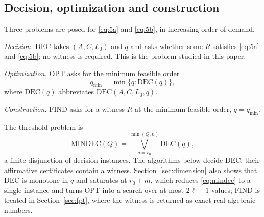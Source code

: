 \documentclass[journal]{IEEEtran}
\theoremstyle{plainn}
\theoremstyle{remark}
\begin{document}
\subsection{Decision, optimization and construction}\label{sec:problems}

Three problems are posed for \eqref{eq:5a} and \eqref{eq:5b}, in increasing order of
demand.

\emph{Decision.} $\mathrm{DEC}$ takes $(A,C,L_0)$ and $q$ and asks whether some $R$
satisfies \eqref{eq:5a} and \eqref{eq:5b}; no witness is required. This is the problem
studied in this paper.

\emph{Optimization.} $\mathrm{OPT}$ asks for the minimum feasible order
\begin{equation*}
q_{\min}=\min\{q:\mathrm{DEC}(q)\},
\end{equation*}
where $\mathrm{DEC}(q)$ abbreviates $\mathrm{DEC}(A,C,L_0,q)$.

\emph{Construction.} $\mathrm{FIND}$ asks for a witness $R$ at the minimum feasible
order, $q=q_{\min}$.

The threshold problem is
\begin{equation}\label{eq:mindec}
\mathrm{MINDEC}(Q)=\bigvee_{q=r_0}^{\min(Q,n)}\mathrm{DEC}(q),
\end{equation}
a finite disjunction of decision instances. The algorithms below decide $\mathrm{DEC}$;
their affirmative certificates contain a witness. Section~\ref{sec:dimension} also shows
that $\mathrm{DEC}$ is monotone in $q$ and saturates at $r_0+m$, which reduces
\eqref{eq:mindec} to a single instance and turns $\mathrm{OPT}$ into a search over at most
$2\ell+1$ values; $\mathrm{FIND}$ is treated in Section~\ref{sec:fpt}, where the witness is
returned as exact real algebraic numbers.
\end{document}
